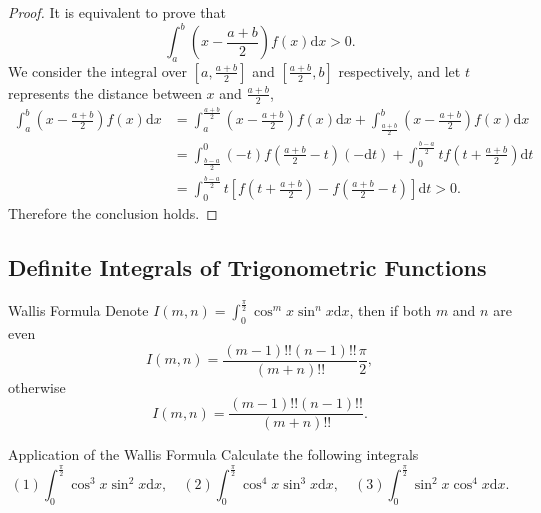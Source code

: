 \begin{proof}
  It is equivalent to prove that
  \begin{equation}
    \int_a^b \left( x - \frac{a+b}{2} \right) f(x)\mathrm{d} x > 0.
  \end{equation}
  We consider the integral over $[a, \frac{a+b}{2}]$ and $[\frac{a+b}{2}, b]$ respectively,
  and let $t$ represents the distance between $x$ and $\frac{a+b}{2}$,
  \begin{align}
    \int_a^b \left( x - \frac{a+b}{2} \right)f(x)\mathrm{d} x
    &=  \int_a^{\frac{a+b}{2}} \left( x - \frac{a+b}{2} \right) f(x)\mathrm{d} x + \int_{\frac{a+b}{2}}^b \left( x - \frac{a+b}{2} \right) f(x)\mathrm{d} x\\
    &= \int_{\frac{b-a}{2}}^0 (-t) f(\frac{a+b}{2} - t)(-\mathrm{d} t) + \int_0^{\frac{b-a}{2}} tf(t + \frac{a+b}{2})\mathrm{d} t\\
    &= \int _0^{\frac{b-a}{2}} t \left[ f(t + \frac{a+b}{2}) - f(\frac{a+b}{2} - t) \right]\mathrm{d} t > 0.
  \end{align}
  Therefore the conclusion holds.
\end{proof}

\subsection{Definite Integrals of Trigonometric Functions}

\begin{theorem}{Wallis Formula}{}
  Denote $I(m, n) = \int_0^{\frac{\pi}{2}} \cos ^m x \sin^n x\mathrm{d}x$,
  then if both $m$ and $n$ are even
  \begin{equation}
    I(m, n) = \frac{(m-1)!! (n-1)!!}{(m+n)!!} \frac{\pi}{2},
  \end{equation}
  otherwise
  \begin{equation}
    I(m, n) = \frac{(m-1)!! (n-1)!!}{(m+n)!!}.
  \end{equation}
\end{theorem}

\begin{example}{Application of the Wallis Formula}{}
  Calculate the following integrals
  \begin{equation}
    (1) \int_0^{\frac{\pi}{2}} \cos^3 x \sin^2 x \mathrm{d} x, \quad
    (2) \int_0^{\frac{\pi}{2}} \cos^4 x \sin^3 x \mathrm{d} x, \quad
    (3) \int_0^{\frac{\pi}{2}} \sin^2 x \cos^4 x \mathrm{d} x.
  \end{equation}
\end{example}

